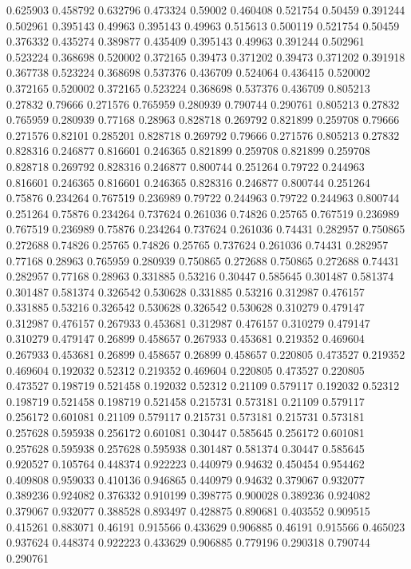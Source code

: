 0.625903 0.458792
0.632796 0.473324
0.59002 0.460408
0.521754 0.50459
0.391244 0.502961
0.395143 0.49963
0.395143 0.49963
0.515613 0.500119
0.521754 0.50459
0.376332 0.435274
0.389877 0.435409
0.395143 0.49963
0.391244 0.502961
0.523224 0.368698
0.520002 0.372165
0.39473 0.371202
0.39473 0.371202
0.391918 0.367738
0.523224 0.368698
0.537376 0.436709
0.524064 0.436415
0.520002 0.372165
0.520002 0.372165
0.523224 0.368698
0.537376 0.436709
0.805213 0.27832
0.79666 0.271576
0.765959 0.280939
0.790744 0.290761
0.805213 0.27832
0.765959 0.280939
0.77168 0.28963
0.828718 0.269792
0.821899 0.259708
0.79666 0.271576
0.82101 0.285201
0.828718 0.269792
0.79666 0.271576
0.805213 0.27832
0.828316 0.246877
0.816601 0.246365
0.821899 0.259708
0.821899 0.259708
0.828718 0.269792
0.828316 0.246877
0.800744 0.251264
0.79722 0.244963
0.816601 0.246365
0.816601 0.246365
0.828316 0.246877
0.800744 0.251264
0.75876 0.234264
0.767519 0.236989
0.79722 0.244963
0.79722 0.244963
0.800744 0.251264
0.75876 0.234264
0.737624 0.261036
0.74826 0.25765
0.767519 0.236989
0.767519 0.236989
0.75876 0.234264
0.737624 0.261036
0.74431 0.282957
0.750865 0.272688
0.74826 0.25765
0.74826 0.25765
0.737624 0.261036
0.74431 0.282957
0.77168 0.28963
0.765959 0.280939
0.750865 0.272688
0.750865 0.272688
0.74431 0.282957
0.77168 0.28963
0.331885 0.53216
0.30447 0.585645
0.301487 0.581374
0.301487 0.581374
0.326542 0.530628
0.331885 0.53216
0.312987 0.476157
0.331885 0.53216
0.326542 0.530628
0.326542 0.530628
0.310279 0.479147
0.312987 0.476157
0.267933 0.453681
0.312987 0.476157
0.310279 0.479147
0.310279 0.479147
0.26899 0.458657
0.267933 0.453681
0.219352 0.469604
0.267933 0.453681
0.26899 0.458657
0.26899 0.458657
0.220805 0.473527
0.219352 0.469604
0.192032 0.52312
0.219352 0.469604
0.220805 0.473527
0.220805 0.473527
0.198719 0.521458
0.192032 0.52312
0.21109 0.579117
0.192032 0.52312
0.198719 0.521458
0.198719 0.521458
0.215731 0.573181
0.21109 0.579117
0.256172 0.601081
0.21109 0.579117
0.215731 0.573181
0.215731 0.573181
0.257628 0.595938
0.256172 0.601081
0.30447 0.585645
0.256172 0.601081
0.257628 0.595938
0.257628 0.595938
0.301487 0.581374
0.30447 0.585645
0.920527 0.105764
0.448374 0.922223
0.440979 0.94632
0.450454 0.954462
0.409808 0.959033
0.410136 0.946865
0.440979 0.94632
0.379067 0.932077
0.389236 0.924082
0.376332 0.910199
0.398775 0.900028
0.389236 0.924082
0.379067 0.932077
0.388528 0.893497
0.428875 0.890681
0.403552 0.909515
0.415261 0.883071
0.46191 0.915566
0.433629 0.906885
0.46191 0.915566
0.465023 0.937624
0.448374 0.922223
0.433629 0.906885
0.779196 0.290318
0.790744 0.290761

